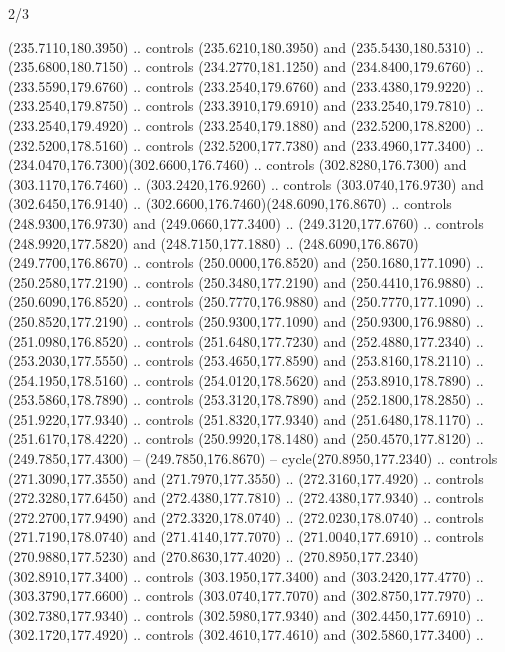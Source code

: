 \begin{flagdescription}{2/3}
\begin{scope}[xshift=0.5\flaglength,yshift=0.5\flagwidth,scale=\flagwidth/259.2]
\begin{scope}[y=0.8pt, x=0.8pt, yscale=-1,shift={(-243,-162)}]
      (235.7110,180.3950) .. controls (235.6210,180.3950) and (235.5430,180.5310) ..
      (235.6800,180.7150) .. controls (234.2770,181.1250) and (234.8400,179.6760) ..
      (233.5590,179.6760) .. controls (233.2540,179.6760) and (233.4380,179.9220) ..
      (233.2540,179.8750) .. controls (233.3910,179.6910) and (233.2540,179.7810) ..
      (233.2540,179.4920) .. controls (233.2540,179.1880) and (232.5200,178.8200) ..
      (232.5200,178.5160) .. controls (232.5200,177.7380) and (233.4960,177.3400) ..
      (234.0470,176.7300)(302.6600,176.7460) .. controls (302.8280,176.7300) and
      (303.1170,176.7460) .. (303.2420,176.9260) .. controls (303.0740,176.9730) and
      (302.6450,176.9140) .. (302.6600,176.7460)(248.6090,176.8670) .. controls
      (248.9300,176.9730) and (249.0660,177.3400) .. (249.3120,177.6760) .. controls
      (248.9920,177.5820) and (248.7150,177.1880) ..
      (248.6090,176.8670)(249.7700,176.8670) .. controls (250.0000,176.8520) and
      (250.1680,177.1090) .. (250.2580,177.2190) .. controls (250.3480,177.2190) and
      (250.4410,176.9880) .. (250.6090,176.8520) .. controls (250.7770,176.9880) and
      (250.7770,177.1090) .. (250.8520,177.2190) .. controls (250.9300,177.1090) and
      (250.9300,176.9880) .. (251.0980,176.8520) .. controls (251.6480,177.7230) and
      (252.4880,177.2340) .. (253.2030,177.5550) .. controls (253.4650,177.8590) and
      (253.8160,178.2110) .. (254.1950,178.5160) .. controls (254.0120,178.5620) and
      (253.8910,178.7890) .. (253.5860,178.7890) .. controls (253.3120,178.7890) and
      (252.1800,178.2850) .. (251.9220,177.9340) .. controls (251.8320,177.9340) and
      (251.6480,178.1170) .. (251.6170,178.4220) .. controls (250.9920,178.1480) and
      (250.4570,177.8120) .. (249.7850,177.4300) -- (249.7850,176.8670) --
      cycle(270.8950,177.2340) .. controls (271.3090,177.3550) and
      (271.7970,177.3550) .. (272.3160,177.4920) .. controls (272.3280,177.6450) and
      (272.4380,177.7810) .. (272.4380,177.9340) .. controls (272.2700,177.9490) and
      (272.3320,178.0740) .. (272.0230,178.0740) .. controls (271.7190,178.0740) and
      (271.4140,177.7070) .. (271.0040,177.6910) .. controls (270.9880,177.5230) and
      (270.8630,177.4020) .. (270.8950,177.2340)(302.8910,177.3400) .. controls
      (303.1950,177.3400) and (303.2420,177.4770) .. (303.3790,177.6600) .. controls
      (303.0740,177.7070) and (302.8750,177.7970) .. (302.7380,177.9340) .. controls
      (302.5980,177.9340) and (302.4450,177.6910) .. (302.1720,177.4920) .. controls
      (302.4610,177.4610) and (302.5860,177.3400) ..

\end{scope}
\end{scope}
\end{flagdescription}
